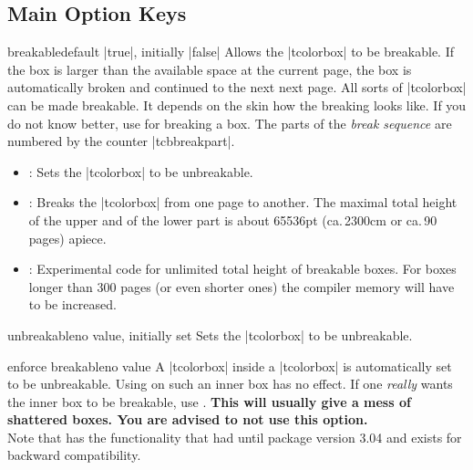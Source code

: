 \subsection{Main Option Keys}
\begin{docTcbKey}{breakable}{}{default |true|, initially |false|}
  Allows the |tcolorbox| to be breakable. If the box is larger than the
  available space at the current page, the box is automatically broken
  and continued to the next next page. All sorts of |tcolorbox| can be made
  breakable. It depends on the skin how the breaking looks like.
  If you do not know better, use  for breaking a box.
  The parts of the \emph{break sequence} are numbered
  by the counter |tcbbreakpart|.
  \begin{itemize}
  \item{}: Sets the |tcolorbox| to be unbreakable.
  \item{}: Breaks the |tcolorbox| from one page to another.
    The maximal total height of the upper and of the lower part is
    about 65536pt (ca.\,2300cm or ca.\,90 pages) apiece.
  \item{}: Experimental code for unlimited total height of
    breakable boxes.
    For boxes longer than 300 pages (or even shorter ones) the
    compiler memory will have to be increased.
  \end{itemize}

\begin{dispListing}

\begin{tcolorbox}[breakable,title=My breakable box]
\lipsum[1-6]
\end{tcolorbox}
\end{dispListing}
\end{docTcbKey}
{\tcbusetemp}


\begin{docTcbKey}{unbreakable}{}{no value, initially set}
  Sets the |tcolorbox| to be unbreakable.
\end{docTcbKey}


\begin{docTcbKey}{enforce breakable}{}{no value}
  A |tcolorbox| inside a |tcolorbox| is automatically set to be unbreakable.
  Using  on such an inner box has no effect.
  If one \emph{really} wants the inner box to be breakable, use .
  \textbf{This will usually give a mess of shattered boxes. You are advised to not use this option.}\\
  Note that  has the functionality
  that  had until package version 3.04
  and exists for backward compatibility.
\end{docTcbKey}


